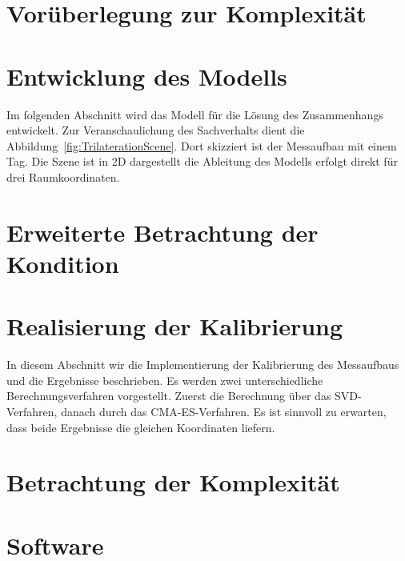 \section{Vorüberlegung zur Komplexität}
\label{sec:Komplexity1}

%
\section{Entwicklung des Modells}
\label{sec:model_developement}
Im folgenden Abschnitt wird das Modell für die Lösung des Zusammenhangs entwickelt. Zur Veranschaulichung des Sachverhalts dient die Abbildung~\ref{fig:TrilaterationScene}. Dort skizziert ist der Messaufbau mit einem Tag. Die Szene ist in 2D dargestellt die Ableitung des Modells erfolgt direkt für drei Raumkoordinaten.
%

%
\section{Erweiterte Betrachtung der Kondition}

%
\section{Realisierung der Kalibrierung}
\label{sec:calibration}
In diesem Abschnitt wir die Implementierung der Kalibrierung des Messaufbaus und die Ergebnisse beschrieben. Es werden zwei unterschiedliche Berechnungsverfahren vorgestellt. Zuerst die Berechnung über das SVD-Verfahren, danach durch das CMA-ES-Verfahren. Es ist sinnvoll zu erwarten, dass beide Ergebnisse die gleichen Koordinaten liefern.
%

%
%
\section{Betrachtung der Komplexität}
\label{sec:Komplexity2}


\section{Software}
\label{sec:sw}

\lipsum[1-3]


